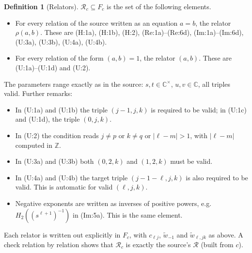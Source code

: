\documentclass[11pt]{article}
\theoremstyle{definition}
\newtheorem{definition}[theorem]{Definition}
\theoremstyle{remark}
\newcommand{\Cx}{\mathbb{C}^\times}
\newcommand{\wt}{\widetilde{w}}
\begin{document}
\begin{definition}[Relators]
$\mathcal R_c\subseteq F_c$ is the set of the following elements.
\begin{itemize}
\item For every relation of the source written as an equation $a=b$, the relator $\rho(a,b)$. These are (H:1a), (H:1b), (H:2), (Re:1a)--(Re:6d), (Im:1a)--(Im:6d), (U:3a), (U:3b), (U:4a), (U:4b).
\item For every relation of the form $(a,b)=1$, the relator $(a,b)$. These are (U:1a)--(U:1d) and (U:2).
\end{itemize}
The parameters range exactly as in the source: $s,t\in\Cx$, $u,v\in\mathbb C$, all triples valid. Further remarks:
\begin{itemize}
\item In (U:1a) and (U:1b) the triple $(j-1,j,k)$ is required to be valid; in (U:1c) and (U:1d), the triple $(0,j,k)$.
\item In (U:2) the condition reads $j\ne p$ or $k\ne q$ or $|\ell-m|>1$, with $|\ell-m|$ computed in $\mathbb Z$.
\item In (U:3a) and (U:3b) both $(0,2,k)$ and $(1,2,k)$ must be valid.
\item In (U:4a) and (U:4b) the target triple $(j-1-\ell,j,k)$ is also required to be valid. This is automatic for valid $(\ell,j,k)$.
\item Negative exponents are written as inverses of positive powers, e.g.\ $H_2((s^{\ell+1})^{-1})$ in (Im:5a). This is the same element.
\end{itemize}
Each relator is written out explicitly in $F_c$, with $c_{\ell j}$, $\wt_{-1}$ and $\wt_{\ell,jk}$ as above. A check relation by relation shows that $\mathcal R_c$ is exactly the source's $\mathcal R$ (built from $c$).
\end{definition}
\end{document}
